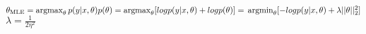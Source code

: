 \begin{answer}
$\theta_{\text{MLE}} =
\operatorname*{argmax}_\theta p(y|x, \theta) p(\theta) =\operatorname*{argmax}_\theta[logp(y|x, \theta) + logp(\theta)] =\\ \operatorname*{argmin}_\theta[-logp(y|x, \theta) + \lambda ||\theta||_{2}^{2}] $ \\
$\lambda = \frac{1}{2 \eta^2}$
\end{answer}
